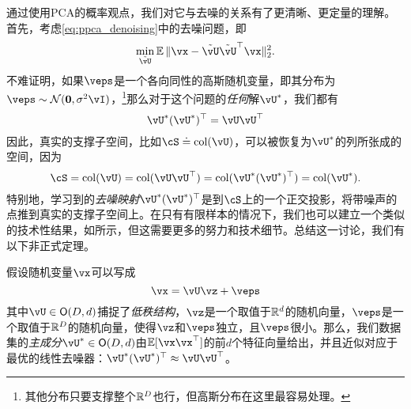 \documentclass[../../book-main.tex]{subfiles}
\begin{document}
\begin{remark}
    通过使用PCA的概率观点，我们对它与去噪的关系有了更清晰、更定量的理解。首先，考虑\eqref{eq:ppca_denoising}中的去噪问题，即
    \begin{equation}
        \min_{\tilde{\vU}}\Ex\norm{\vx - \tilde{\vU}\tilde{\vU}^{\top}\vx}_{2}^{2}.
    \end{equation}
    不难证明，如果\(\veps\)是一个各向同性的高斯随机变量，即其分布为\(\veps \sim \dNorm(\vzero, \sigma^{2}\vI)\)，\footnote{其他分布只要支撑整个\(\mathbb{R}^{D}\)也行，但高斯分布在这里最容易处理。}那么对于这个问题的\textit{任何}解\(\vU^{\ast}\)，我们都有
    \begin{equation}
        \vU^{\ast}(\vU^{\ast})^{\top} = \vU\vU^{\top}
    \end{equation}
    因此，真实的支撑子空间，比如\(\cS \doteq \mathrm{col}(\vU)\)，可以被恢复为\(\vU^{\ast}\)的列所张成的空间，因为
    \begin{equation}
        \cS = \mathrm{col}(\vU) = \mathrm{col}(\vU\vU^{\top}) = \mathrm{col}(\vU^{\ast}(\vU^{\ast})^{\top}) = \mathrm{col}(\vU^{\ast}).
    \end{equation}
    特别地，学习到的\textit{去噪映射}\(\vU^{\ast}(\vU^{\ast})^{\top}\)是到\(\cS\)上的一个正交投影，将带噪声的点推到真实的支撑子空间上。在只有有限样本的情况下，我们也可以建立一个类似的技术性结果，如所示，但这需要更多的努力和技术细节。总结这一讨论，我们有以下非正式定理。
\end{remark}


\begin{theorem}\label{thm:ppca}
    假设随机变量\(\vx\)可以写成
    \begin{equation}
        \vx = \vU\vz + \veps
    \end{equation}
    其中\(\vU \in \O(D, d)\)捕捉了\textit{低秩结构}，\(\vz\)是一个取值于\(\mathbb{R}^{d}\)的随机向量，\(\veps\)是一个取值于\(\mathbb{R}^{D}\)的随机向量，使得\(\vz\)和\(\veps\)独立，且\(\veps\)很小。那么，我们数据集的\textit{主成分}\(\vU^{\ast} \in \O(D, d)\)由\(\Ex[\vx\vx^{\top}]\)的前\(d\)个特征向量给出，并且近似对应于最优的线性去噪器：\(\vU^{\ast}(\vU^{\ast})^{\top} \approx \vU\vU^{\top}\)。
\end{theorem}


\end{document}
